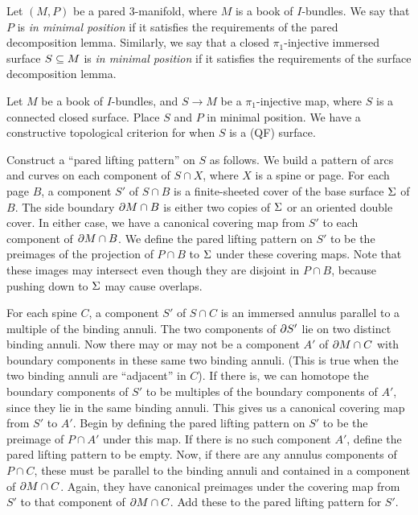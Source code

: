 \begin{defn}

Let $(M,P)$ be a pared $3$-manifold, where $M$ is a book of $I$-bundles.  We
say that $P$ is \emph{in minimal position} if it satisfies the requirements of
the pared decomposition lemma. Similarly, we say that a closed
$\pi_1$-injective immersed surface $S\subseteq M$ is \emph{in minimal position} if
it satisfies the requirements of the surface decomposition lemma.

\end{defn}

Let $M$ be a book of $I$-bundles, and $S \to M$ be a $\pi_1$-injective map,
where $S$ is a connected closed surface.  Place $S$ and $P$ in minimal
position. We have a constructive topological criterion for when $S$ is a (QF)
surface.

Construct a ``pared lifting pattern'' on $S$ as follows. We build a pattern of
arcs and curves on each component of $S \cap X$, where $X$ is a spine or page.
For each page $B$, a component $S'$ of $S \cap B$ is a finite-sheeted cover of
the base surface $\Sigma$ of $B$. The side boundary $\partial M \cap B$ is either two
copies of $\Sigma$ or an oriented double cover. In either case, we have
a canonical covering map from $S'$ to each component of $\partial M \cap B$. We
define the pared lifting pattern on $S'$ to be the preimages of the projection
of $P \cap B$ to $\Sigma$ under these covering maps.  Note that these images may
intersect even though they are disjoint in $P \cap B$, because pushing down to
$\Sigma$ may cause overlaps.

For each spine $C$, a component $S'$ of $S \cap C$ is an immersed annulus
parallel to a multiple of the binding annuli.  The two components of $\partial S'$
lie on two distinct binding annuli. Now there may or may not be a component
$A'$ of $\partial M \cap C$ with boundary components in these same two binding
annuli.  (This is true when the two binding annuli are ``adjacent'' in $C$). If
there is, we can homotope the boundary components of $S'$ to be multiples of
the boundary components of $A'$, since they lie in the same binding annuli.
This gives us a canonical covering map from $S'$ to $A'$. Begin by defining the
pared lifting pattern on $S'$ to be the preimage of $P \cap A'$ under this map.
If there is no such component $A'$, define the pared lifting pattern to be
empty.  Now, if there are any annulus components of $P \cap C$, these must be
parallel to the binding annuli and contained in a component of $\partial M \cap C$.
Again, they have canonical preimages under the covering map from $S'$ to that
component of $\partial M \cap C$. Add these to the pared lifting pattern for $S'$.

